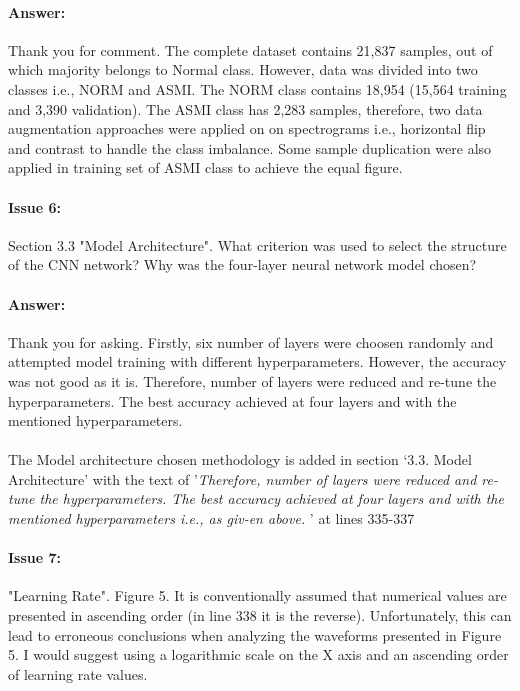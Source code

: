\documentclass{article}
\begin{document}
\paragraph{Answer:}
Thank you for comment. The complete dataset contains 21,837 samples, out of which majority belongs to Normal class. However, data was divided into two classes i.e., NORM and ASMI. The NORM class contains 18,954 (15,564 training and 3,390 validation). The ASMI class has 2,283 samples, therefore, two data augmentation approaches were applied on on spectrograms i.e., horizontal flip and contrast to handle the class imbalance. Some sample duplication were also applied in training set of ASMI class to achieve the equal figure.

\paragraph{Issue 6:}
\begin{displayquote}
Section 3.3 "Model Architecture". What criterion was used to select the structure of the CNN network? Why was the four-layer neural network model chosen?
\end{displayquote}

\paragraph{Answer:}
Thank you for asking. Firstly, six number of layers were choosen randomly and attempted model training with different hyperparameters. However, the accuracy was not good as it is. Therefore, number of layers were reduced and re-tune the hyperparameters. The best accuracy achieved at four layers and with the mentioned hyperparameters. \\\\

The Model architecture chosen methodology is added in section `3.3. Model Architecture' with the text of '\textit{Therefore, number of layers were reduced and re-tune the hyperparameters. The best accuracy achieved at four layers and with the mentioned hyperparameters i.e., as giv-en above. }' at lines 335-337

\paragraph{Issue 7:}
\begin{displayquote}
"Learning Rate". Figure 5. It is conventionally assumed that numerical values are presented in ascending order (in line 338 it is the reverse). Unfortunately, this can lead to erroneous conclusions when analyzing the waveforms presented in Figure 5. I would suggest using a logarithmic scale on the X axis and an ascending order of learning rate values.
\end{displayquote}
\end{document}
